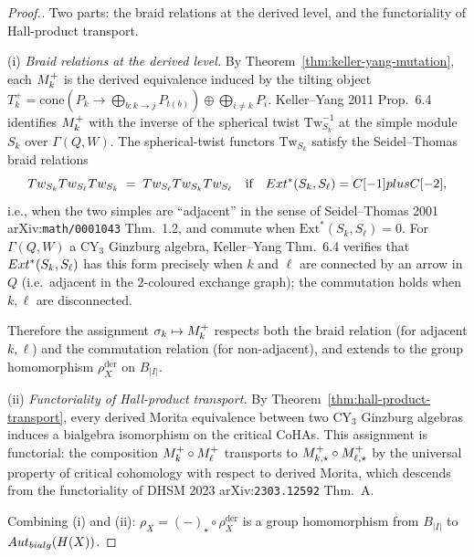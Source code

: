 \begin{proof}[Proof.]
Two parts: the braid relations at the derived level, and the functoriality
of Hall-product transport.

(i) \emph{Braid relations at the derived level.} By
Theorem~\ref{thm:keller-yang-mutation}, each $M_k^{+}$ is the derived
equivalence induced by the tilting object $T_k^{+} = \mathrm{cone}(P_k \to
\bigoplus_{b \colon k \to j} P_{t(b)}) \oplus \bigoplus_{i \neq k} P_i$.
Keller--Yang 2011 Prop.~6.4 identifies $M_k^{+}$ with the inverse of the
spherical twist $\mathrm{Tw}_{S_k}^{-1}$ at the simple module $S_k$ over
$\Gamma(Q, W)$. The spherical-twist functors $\mathrm{Tw}_{S_k}$ satisfy
the Seidel--Thomas braid relations
\[
  Tw_{S_k} Tw_{S_\ell} Tw_{S_k}
  \;=\;
  Tw_{S_\ell} Tw_{S_k} Tw_{S_\ell}
  \quad\text{if}\quad Ext^{*}(S_k, S_\ell) = C[-1] plus C[-2],
\]
i.e., when the two simples are ``adjacent'' in the sense of Seidel--Thomas
2001 arXiv:\texttt{math/0001043} Thm.~1.2, and commute when
$\mathrm{Ext}^{*}(S_k, S_\ell) = 0$. For $\Gamma(Q, W)$ a CY$_3$ Ginzburg
algebra, Keller--Yang Thm.~6.4 verifies that $Ext^{*}(S_k, S_\ell)$ has
this form precisely when $k$ and $\ell$ are connected by an arrow in $Q$
(i.e.\ adjacent in the $2$-coloured exchange graph); the commutation holds
when $k, \ell$ are disconnected.

Therefore the assignment $\sigma_k \mapsto M_k^{+}$ respects both the
braid relation (for adjacent $k, \ell$) and the commutation relation (for
non-adjacent), and extends to the group homomorphism $\rho_X^{\mathrm{der}}$
on $B_{|I|}$.

(ii) \emph{Functoriality of Hall-product transport.} By
Theorem~\ref{thm:hall-product-transport}, every derived Morita equivalence
between two CY$_3$ Ginzburg algebras induces a bialgebra isomorphism on the
critical CoHAs. This assignment is functorial: the composition
$M_k^{+} \circ M_\ell^{+}$ transports to $M_{k,\star}^{+} \circ
M_{\ell,\star}^{+}$ by the universal property of critical cohomology with
respect to derived Morita, which descends from the functoriality of
DHSM 2023 arXiv:\texttt{2303.12592} Thm.~A.

Combining (i) and (ii): $\rho_X = (-)_{\star} \circ \rho_X^{\mathrm{der}}$
is a group homomorphism from $B_{|I|}$ to
$Aut_{bialg}(H(X))$.
\end{proof}

